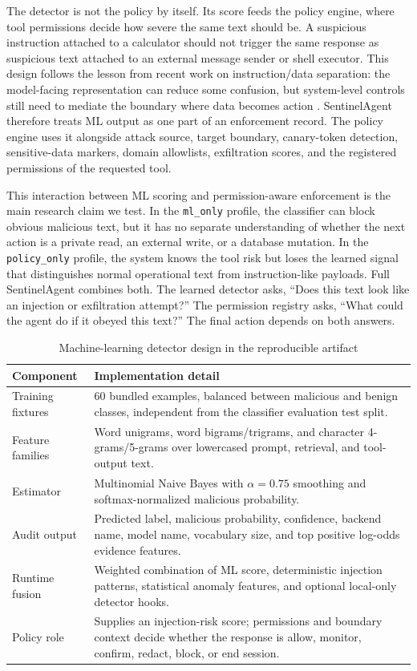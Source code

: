 \documentclass[11pt]{article}
\begin{document}
The detector is not the policy by itself. Its score feeds the policy engine, where tool permissions decide how severe the same text should be. A suspicious instruction attached to a calculator should not trigger the same response as suspicious text attached to an external message sender or shell executor. This design follows the lesson from recent work on instruction/data separation: the model-facing representation can reduce some confusion, but system-level controls still need to mediate the boundary where data becomes action \cite{hines2024spotlighting,chen2024struq,zverev2025can}. SentinelAgent therefore treats ML output as one part of an enforcement record. The policy engine uses it alongside attack source, target boundary, canary-token detection, sensitive-data markers, domain allowlists, exfiltration scores, and the registered permissions of the requested tool.

This interaction between ML scoring and permission-aware enforcement is the main research claim we test. In the \texttt{ml\_only} profile, the classifier can block obvious malicious text, but it has no separate understanding of whether the next action is a private read, an external write, or a database mutation. In the \texttt{policy\_only} profile, the system knows the tool risk but loses the learned signal that distinguishes normal operational text from instruction-like payloads. Full SentinelAgent combines both. The learned detector asks, ``Does this text look like an injection or exfiltration attempt?'' The permission registry asks, ``What could the agent do if it obeyed this text?'' The final action depends on both answers.

\begin{table}[H]
\centering
\caption{Machine-learning detector design in the reproducible artifact}
\label{tab:ml_detector}
\begin{tabular}{lp{}}
\toprule
\textbf{Component} & \textbf{Implementation detail} \\
\midrule
Training fixtures & 60 bundled examples, balanced between malicious and benign classes, independent from the classifier evaluation test split. \\
Feature families & Word unigrams, word bigrams/trigrams, and character 4-grams/5-grams over lowercased prompt, retrieval, and tool-output text. \\
Estimator & Multinomial Naive Bayes with $\alpha=0.75$ smoothing and softmax-normalized malicious probability. \\
Audit output & Predicted label, malicious probability, confidence, backend name, model name, vocabulary size, and top positive log-odds evidence features. \\
Runtime fusion & Weighted combination of ML score, deterministic injection patterns, statistical anomaly features, and optional local-only detector hooks. \\
Policy role & Supplies an injection-risk score; permissions and boundary context decide whether the response is allow, monitor, confirm, redact, block, or end session. \\
\bottomrule
\end{tabular}
\end{table}
\end{document}
